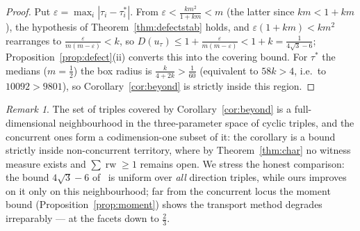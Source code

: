 \documentclass[11pt,reqno]{amsart}
\theoremstyle{plain}
\theoremstyle{definition}
\theoremstyle{remark}
\newtheorem{remark}[theorem]{Remark}
\newcommand{\rw}{\operatorname{rw}}
\begin{document}
\begin{proof}
Put $\varepsilon=\max_i|\tau_i-\tau_i^*|$. From
$\varepsilon<\frac{km^2}{1+km}<m$ (the latter since $km<1+km$), the
hypothesis of Theorem~\ref{thm:defectstab} holds, and
$\varepsilon(1+km)<km^2$ rearranges to
$\frac\varepsilon{m(m-\varepsilon)}<k$, so
$D(u_\tau)\le1+\frac\varepsilon{m(m-\varepsilon)}<1+k=\tfrac1{4\sqrt3-6}$;
Proposition~\ref{prop:defect}(ii) converts this into the covering bound. For
$\tau^*$ the medians ($m=\tfrac12$) the box radius is
$\frac{k}{4+2k}>\tfrac1{60}$ (equivalent to $58k>4$, i.e.\ to
$10092>9801$), so Corollary~\ref{cor:beyond} is strictly inside this region.
\end{proof}

\begin{remark}\label{rem:beyond}
The set of triples covered by Corollary~\ref{cor:beyond} is a full-dimensional
neighbourhood in the three-parameter space of cyclic triples, and the concurrent
ones form a codimension-one subset of it: the corollary is a bound strictly
inside non-concurrent territory, where by Theorem~\ref{thm:char} no witness
measure exists and $\sum\rw\ge1$ remains open. We stress the honest comparison:
the bound $4\sqrt3-6$ of~\cite{BY26} is uniform over \emph{all} direction
triples, while ours improves on it only on this neighbourhood; far from the
concurrent locus the moment bound (Proposition~\ref{prop:moment}) shows the
transport method degrades irreparably --- at the facets down to $\tfrac23$.
\end{remark}
\end{document}
